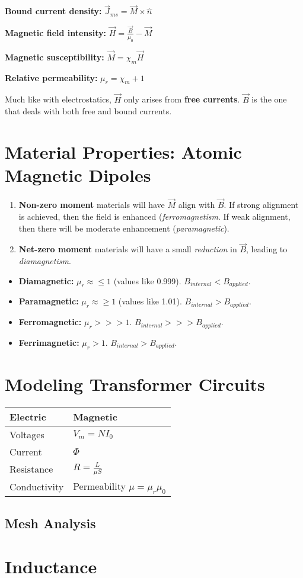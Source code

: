 \documentclass[a4paper,12pt]{report}
\begin{document}
\textbf{Bound current density: } $\vec J_{ms} = \vec M \times \hat n$

\textbf{Magnetic field intensity: } $\vec H = \frac{\vec B}{\mu_0} - \vec{M}$

\textbf{Magnetic susceptibility: } $\vec{M} = \chi_m \vec H$

\textbf{Relative permeability: } $\mu_r = \chi_m + 1$

Much like with electrostatics, $\vec H$ only arises from \textbf{free currents}. $\vec B$ is the one that deals with both free and bound currents. 

\section{Material Properties: Atomic Magnetic Dipoles}

\begin{enumerate}
\item \textbf{Non-zero moment} materials will have $\vec M$ align with $\vec B$. If strong alignment is achieved, then the field is enhanced (\textit{ferromagnetism}. If weak alignment, then there will be moderate enhancement (\textit{paramagnetic}). 
\item \textbf{Net-zero moment} materials will have a small \textit{reduction} in $\vec B$, leading to \textit{diamagnetism}. 
\end{enumerate}

\begin{itemize}
\item \textbf{Diamagnetic: } $\mu_r \approx \leq 1$ (values like 0.999). $B_{internal} < B_{applied}$. 
\item \textbf{Paramagnetic: } $\mu_r \approx \geq 1$ (values like 1.01). $B_{internal} > B_{applied}$. 
\item \textbf{Ferromagnetic: } $\mu_r >>> 1$. $B_{internal} >>> B_{applied}$. 
\item \textbf{Ferrimagnetic: } $\mu_r > 1$. $B_{internal} > B_{applied}$.
\end{itemize}

\section{Modeling Transformer Circuits}

\begin{tabular}{|l|l|}
\hline
\textbf{Electric} & \textbf{Magnetic} \\
\hline
Voltages & $V_m = NI_0$ \\ 
Current & $\Phi$ \\ 
Resistance & $ R = \frac{L}{\mu S}$ \\ 
Conductivity & Permeability $\mu = \mu_r \mu_0$ \\
\hline
\end{tabular}


\subsection{Mesh Analysis}

\section{Inductance}
\end{document}
